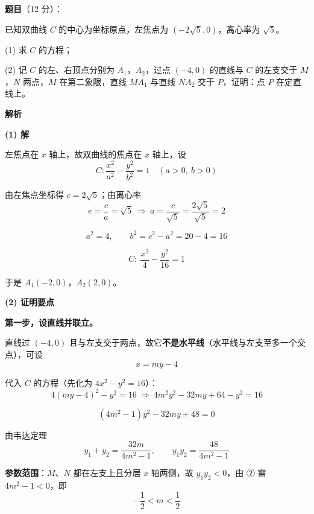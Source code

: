 \begin{answer}

\textbf{题目}（12 分）：

已知双曲线 $C$ 的中心为坐标原点，左焦点为 $\left(-2\sqrt5,0\right)$，离心率为 $\sqrt5$。

  (1) 求 $C$ 的方程；

  (2) 记 $C$ 的左、右顶点分别为 $A_1$，$A_2$，过点 $(-4,0)$ 的直线与 $C$ 的左支交于 $M$，$N$ 两点，$M$ 在第二象限，直线 $MA_1$ 与直线 $NA_2$ 交于 $P$，证明：点 $P$ 在定直线上。

\textbf{解析}

\par\medskip

\textbf{(1) 解}

左焦点在 $x$ 轴上，故双曲线的焦点在 $x$ 轴上，设
\nopagebreak[4]
\[C:\frac{x^{2}}{a^{2}}-\frac{y^{2}}{b^{2}}=1\quad(a>0,\ b>0)\]

由左焦点坐标得 $c=2\sqrt5$；由离心率
\nopagebreak[4]
\[e=\frac ca=\sqrt5\ \Longrightarrow\ a=\frac c{\sqrt5}=\frac{2\sqrt5}{\sqrt5}=2\]

\nopagebreak[4]
\[a^{2}=4,\qquad b^{2}=c^{2}-a^{2}=20-4=16\]

\nopagebreak[4]
\[\boxed{C:\ \frac{x^{2}}4-\frac{y^{2}}{16}=1}\]

于是 $A_1(-2,0)$，$A_2(2,0)$。

\par\medskip

\textbf{(2) 证明要点}

\textbf{第一步，设直线并联立。}

直线过 $(-4,0)$ 且与左支交于两点，故它\textbf{不是水平线}（水平线与左支至多一个交点），可设
\nopagebreak[4]
\[x=my-4\]

代入 $C$ 的方程（先化为 $4x^{2}-y^{2}=16$）：
\nopagebreak[4]
\[4(my-4)^{2}-y^{2}=16\ \Longrightarrow\ 4m^{2}y^{2}-32my+64-y^{2}=16\]

\nopagebreak[4]
\[\left(4m^{2}-1\right)y^{2}-32my+48=0\tag{①}\]

由韦达定理
\nopagebreak[4]
\[y_1+y_2=\frac{32m}{4m^{2}-1},\qquad y_1y_2=\frac{48}{4m^{2}-1}\tag{②}\]

\textbf{参数范围}：$M$、$N$ 都在左支上且分居 $x$ 轴两侧，故 $y_1y_2<0$，由 ② 需 $4m^{2}-1<0$，即
\nopagebreak[4]
\[-\frac12<m<\frac12\]


\end{answer}
